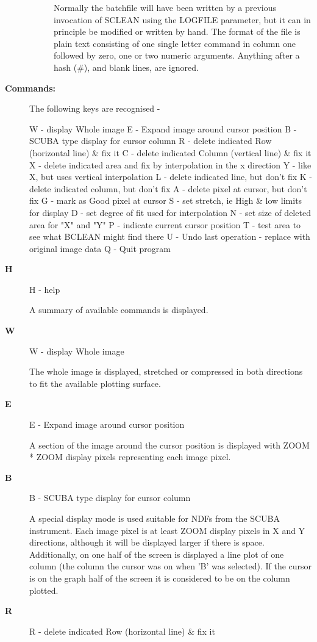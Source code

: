 \begin{description}
\begin{description}
 Normally the batchfile will have been written by a previous invocation
 of SCLEAN using the LOGFILE parameter, but it can in principle be
 modified or written by hand.  The format of the file is plain text
 consisting of one single letter command in column one followed by
 zero, one or two numeric arguments.  Anything after a hash (#), and
 blank lines, are ignored.
\end{description}

\item [{\bf Commands:}]
 The following keys are recognised -

 W - display Whole image
 E - Expand image around cursor position
 B - SCUBA type display for cursor column
 R - delete indicated Row (horizontal line) \& fix it
 C - delete indicated Column (vertical line) \& fix it
 X - delete indicated area and fix by interpolation in the x direction
 Y - like X, but uses vertical interpolation
 L - delete indicated line, but don't fix
 K - delete indicated column, but don't fix
 A - delete pixel at cursor, but don't fix
 G - mark as Good pixel at cursor
 S - set stretch, ie High \& low limits for display
 D - set degree of fit used for interpolation
 N - set size of deleted area for "X" and "Y"
 P - indicate current cursor position
 T - test area to see what BCLEAN might find there
 U - Undo last operation - replace with original image data
 Q - Quit program
\item [{\bf H}]
 H - help

    A summary of available commands is displayed.
\item [{\bf W}]
 W - display Whole image

    The whole image is displayed, stretched or compressed in both
    directions to fit the available plotting surface.
\item [{\bf E}]
 E - Expand image around cursor position

    A section of the image around the cursor position is displayed
    with ZOOM * ZOOM display pixels representing each image pixel.
\item [{\bf B}]
 B - SCUBA type display for cursor column

    A special display mode is used suitable for NDFs from the SCUBA
    instrument.  Each image pixel is at least ZOOM display pixels in
    X and Y directions, although it will be displayed larger if
    there is space.  Additionally, on one half of the screen is
    displayed a line plot of one column (the column the cursor was
    on when 'B' was selected).  If the cursor is on the graph half
    of the screen it is considered to be on the column plotted.
\item [{\bf R}]
 R - delete indicated Row (horizontal line) \& fix it


\end{description}
